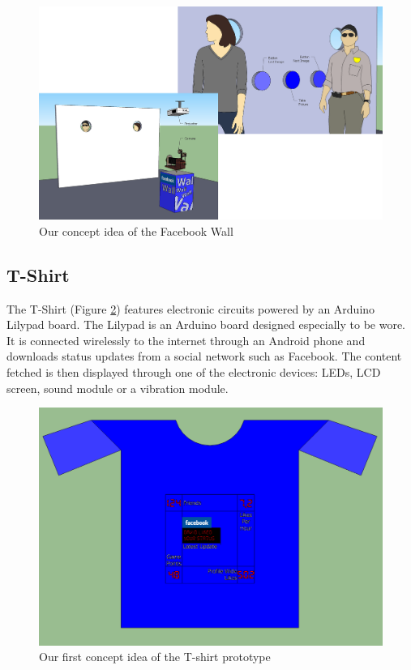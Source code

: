 \begin{figure}[h!]
\centering \includegraphics[scale=0.22]{img/prestudies-facebookwall}
\caption{Our concept idea of the Facebook Wall}
\label{fig:prestudies-facebookwall}
\end{figure}


\subsection{T-Shirt}
The T-Shirt (Figure \ref{fig:prestudies-tshirt})  features electronic circuits powered by an Arduino Lilypad board.
The Lilypad is an Arduino board designed especially to be wore. It is connected wirelessly to the internet through
an Android phone and downloads status updates from a social network such as Facebook.
The content fetched is then displayed through one of the electronic devices: LEDs, LCD screen,
sound module or a vibration module.

\begin{figure}[h!]
\centering \includegraphics[scale=0.35]{img/prestudies-tshirt}
\caption{Our first concept idea of the T-shirt prototype}
\label{fig:prestudies-tshirt}
\end{figure}

